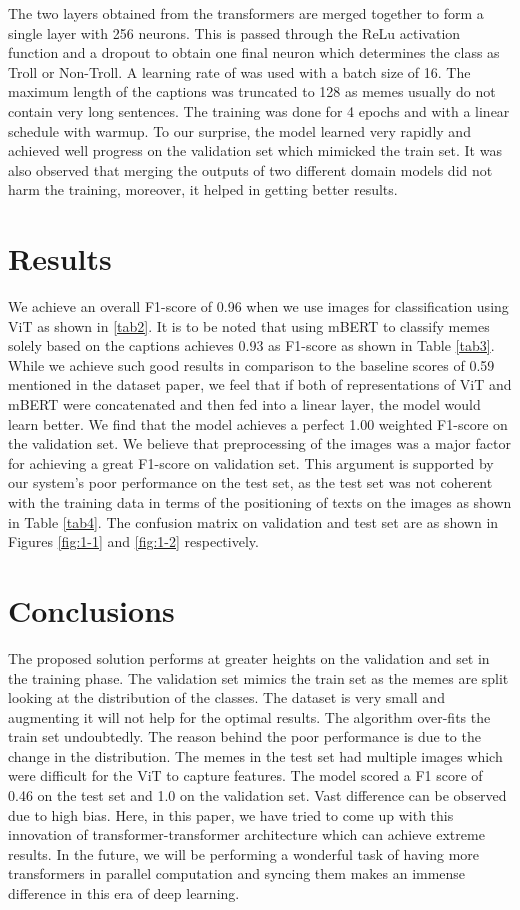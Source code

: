 \documentclass[11pt,a4paper]{article}
\begin{document}
 The two layers obtained from the transformers are merged together to form a single layer with 256 neurons. This is passed through the ReLu activation function and a dropout to obtain one final neuron which determines the class as Troll or Non-Troll. A learning rate of  was used with a batch size of 16. The maximum length of the captions was truncated to 128 as memes usually do not contain very long sentences. The training was done for 4 epochs and with a linear schedule with warmup. To our surprise, the model learned very rapidly and achieved well progress on the validation set which mimicked the train set. It was also observed that merging the outputs of two different domain models did not harm the training, moreover, it helped in getting better results.
 

\section{Results}
\label{results}
We achieve an overall F1-score of 0.96 when we use images for classification using ViT as shown in \ref{tab2}. It is to be noted that using mBERT to classify memes solely based on the captions achieves 0.93 as F1-score as shown in Table \ref{tab3}. While we achieve such good results in comparison to the baseline scores of 0.59 mentioned in the dataset paper, we feel that if both of representations of ViT and mBERT were concatenated and then fed into a linear layer, the model would learn better. We find that the model achieves a perfect 1.00 weighted F1-score on the validation set. We believe that preprocessing of the images was a major factor for achieving a great F1-score on validation set. This argument is supported by our system's poor performance on the test set, as the test set was not coherent with the training data in terms of the positioning of texts on the images as shown in Table \ref{tab4}. The confusion matrix on validation and test set are as shown in Figures \ref{fig:1-1} and \ref{fig:1-2} respectively.
 

\section{Conclusions}
\label{conclusion}
The proposed solution performs at greater heights on the validation and set in the training phase. The validation set mimics the train set as the memes are split looking at the distribution of the classes. The dataset is very small and augmenting it will not help for the optimal results. The algorithm over-fits the train set undoubtedly. The reason behind the poor performance is due to the change in the distribution. The memes in the test set had multiple images which were difficult for the ViT to capture features. The model scored a F1 score of 0.46 on the test set and 1.0 on the validation set. Vast difference can be observed due to high bias. Here, in this paper, we have tried to come up with this innovation of transformer-transformer architecture which can achieve extreme results. In the future, we will be performing a wonderful task of having more transformers in parallel computation and syncing them makes an immense difference in this era of deep learning.      
\end{document}
